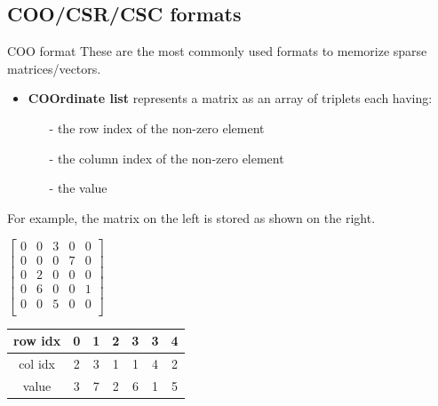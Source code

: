 \documentclass{beamer}
\begin{document}
	\subsection{COO/CSR/CSC formats}
	\begin{frame}{COO format}
		These are the most commonly used formats to memorize sparse matrices/vectors.
		\begin{itemize}
			\item \textbf{COOrdinate list} represents a matrix as an array of triplets each having:
			\begin{itemize}
				\item[-] the row index of the non-zero element
				\item[-] the column index of the non-zero element
				\item[-] the value
			\end{itemize}
		\end{itemize}
		For example, the matrix on the left is stored as shown on the right.\\
		
		\bigskip
		\begin{minipage}{.48\textwidth}
			\begin{center}
				$\begin{bmatrix}
					0 & 0 & 3 & 0 & 0 \\
					0 & 0 & 0 & 7 & 0 \\
					0 & 2 & 0 & 0 & 0 \\
					0 & 6 & 0 & 0 & 1 \\
					0 & 0 & 5 & 0 & 0 \\
				\end{bmatrix}$
			\end{center}
		\end{minipage}
		\hfill
		\begin{minipage}{.48\textwidth}
			\begin{center}
				\def\arraystretch{2}
				\begin{tabular}{|c|c|c|c|c|c|c|}
					\hline
					row idx & 0 & 1 & 2 & 3 & 3 & 4 \\
					\hline
					col idx & 2 & 3 & 1 & 1 & 4 & 2 \\
					\hline
					value & 3 & 7 & 2 & 6 & 1 & 5 \\
					\hline
				\end{tabular}
			\end{center}
		\end{minipage}
	\end{frame}
	
\end{document}
